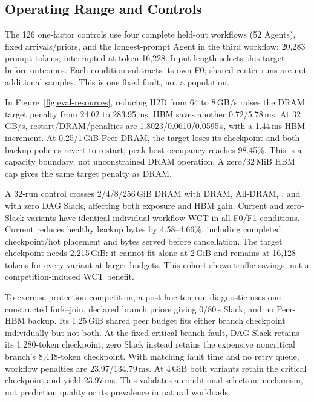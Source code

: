 \subsection{Operating Range and Controls}
\label{sec:eval-sensitivity}
The 126 one-factor controls use four complete held-out workflows (52 Agents),
fixed arrivals/priors, and the longest-prompt Agent in the third workflow:
20,283 prompt tokens, interrupted at token 16,228. Input length selects this
target before outcomes. Each condition subtracts its own F0; shared center
runs are not additional samples. This is one fixed fault, not a population.

In Figure~\ref{fig:eval-resources}, reducing H2D from 64 to 8\,GB/s raises the
DRAM target penalty from 24.02 to 283.95\,ms; HBM saves another 0.72/5.78\,ms.
At 32\,GB/s, restart/DRAM/\system penalties are 1.8023/0.0610/0.0595\,s,
with a 1.44\,ms HBM increment. At 0.25/1\,GiB Peer DRAM, the target loses its
checkpoint and both backup policies revert to restart; peak host occupancy
reaches 98.45\%. This is a capacity boundary, not unconstrained DRAM operation.
A zero/32\,MiB HBM cap gives the same target penalty as DRAM.

A 32-run control crosses 2/4/8/256\,GiB DRAM with DRAM, All-DRAM, \system,
and \system with zero DAG Slack, affecting both exposure and HBM gain.
Current and zero-Slack variants have identical individual workflow WCT in
all F0/F1 conditions. Current reduces healthy backup bytes by 4.58--4.66\%,
including completed checkpoint/hot placement and bytes served before cancellation.
The target checkpoint needs 2.215\,GiB: it cannot fit alone at 2\,GiB and
remains at 16,128 tokens for every variant at larger budgets. This cohort shows
traffic savings, not a competition-induced WCT benefit.

To exercise protection competition, a post-hoc ten-run diagnostic uses one
constructed fork--join, declared branch priors giving 0/80\,s Slack, and no
Peer-HBM backup. Its 1.25\,GiB shared peer budget fits either branch checkpoint
individually but not both. At the fixed critical-branch fault, DAG Slack retains
its 1,280-token checkpoint; zero Slack instead retains the expensive noncritical
branch's 8,448-token checkpoint. With matching fault time and no retry queue,
workflow penalties are 23.97/134.79\,ms. At 4\,GiB both variants retain the
critical checkpoint and yield 23.97\,ms. This validates a conditional selection
mechanism, not prediction quality or its prevalence in natural workloads.

